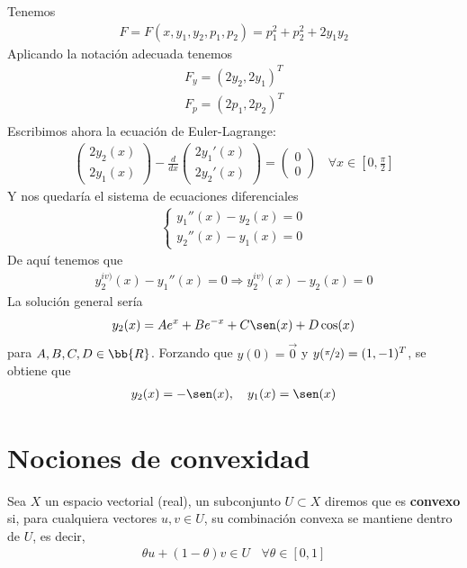 Tenemos
\begin{gather*}
    F = F(x,y_1,y_2,p_1,p_2) = p_1^2 + p_2^2 + 2y_1y_2
\end{gather*}
Aplicando la notación adecuada tenemos 
\begin{gather*}
    F_y = (2y_2, 2y_1)^T\\
    F_p = (2p_1, 2p_2)^T\\
\end{gather*}
Escribimos ahora la ecuación de Euler-Lagrange:
\begin{gather*}
    \begin{pmatrix}
        2y_2(x)\\
        2y_1(x)
    \end{pmatrix}
    - \frac{d}{dx}
    \begin{pmatrix}
        2y_1'(x)\\
        2y_2'(x)
    \end{pmatrix} = 
    \begin{pmatrix}
        0 \\
        0
    \end{pmatrix}
    \ \ \ \ \forall x \in \left[0, \frac{\pi}{2}\right]
\end{gather*}
Y nos quedaría el sistema de ecuaciones diferenciales
\begin{gather*}
    \left\{
        \begin{array}{l}
            y_1''(x) - y_2(x) = 0\\
            y_2''(x) - y_1(x) = 0
        \end{array}
    \right.
\end{gather*}
De aquí tenemos que 
\begin{gather*}
    y_2^{iv)} (x) - y_1''(x) = 0 \Rightarrow y_2^{iv)}(x) -y_2(x) = 0
\end{gather*}
La solución general sería 
\begin{gather*}
    y_2(x) = Ae^x + Be^{-x} + C\sen(x) + D\cos(x)
\end{gather*}
para $A,B,C,D\in \bb{R}$. Forzando que $y(0)=\vec{0}$ y $y(\nicefrac{\pi}{2}) = (1,-1)^T$, se obtiene que 
\begin{gather*}
    y_2(x) = -\sen(x),\ \ \ y_1(x) = \sen(x)
\end{gather*}

\section{Nociones de convexidad}
\begin{definicion}
    Sea $X$ un espacio vectorial (real), un subconjunto $U\subset X$ diremos que es \textbf{convexo} si, para cualquiera vectores $u,v\in U$, su combinación convexa se mantiene dentro de $U$, es decir,
    \begin{gather*}
        \theta u + (1-\theta)v\in U \ \ \ \ \forall \theta \in [0,1]
    \end{gather*}
\end{definicion}

